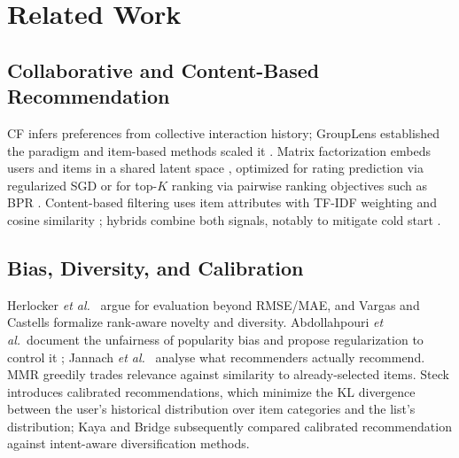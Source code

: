 \documentclass[conference]{IEEEtran}
\begin{document}
  \section{Related Work}\label{sec:related}
  \subsection{Collaborative and Content-Based Recommendation}
  CF infers preferences from collective interaction history; GroupLens \cite{resnick1994} established the paradigm and item-based methods scaled it \cite{sarwar2001}. Matrix factorization embeds users and items in a shared latent space \cite{koren2009}, optimized for rating prediction via regularized SGD \cite{funk2006} or for top-$K$ ranking via pairwise ranking objectives such as BPR \cite{rendle2009}. Content-based filtering uses item attributes with TF-IDF weighting \cite{salton1988} and cosine similarity \cite{lops2011}; hybrids combine both signals, notably to mitigate cold start \cite{burke2002,adomavicius2005,schein2002}.

  \subsection{Bias, Diversity, and Calibration}
  Herlocker \emph{et al.}\ \cite{herlocker2004} argue for evaluation beyond RMSE/MAE, and Vargas and Castells \cite{vargas2011} formalize rank-aware novelty and diversity. Abdollahpouri \emph{et al.}\ document the unfairness of popularity bias \cite{abdollahpouri2019} and propose regularization to control it \cite{abdollahpouri2017}; Jannach \emph{et al.}\ \cite{jannach2015} analyse what recommenders actually recommend. MMR \cite{carbonell1998} greedily trades relevance against similarity to already-selected items. Steck \cite{steck2018} introduces calibrated recommendations, which minimize the KL divergence between the user's historical distribution over item categories and the list's distribution; Kaya and Bridge \cite{kaya2019} subsequently compared calibrated recommendation against intent-aware diversification methods.
\end{document}
